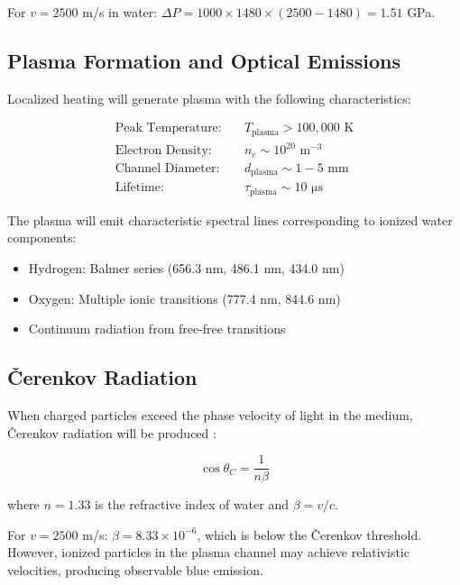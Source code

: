 \documentclass[12pt,a4paper]{article}
\begin{document}
For $v = 2500$ m/s in water: $\Delta P = 1000 \times 1480 \times (2500 - 1480) = 1.51$ GPa.

\subsection{Plasma Formation and Optical Emissions}

Localized heating will generate plasma with the following characteristics:

\begin{align}
\text{Peak Temperature:} &\quad T_{\text{plasma}} > 100,000 \text{ K} \\
\text{Electron Density:} &\quad n_e \sim 10^{20} \text{ m}^{-3} \\
\text{Channel Diameter:} &\quad d_{\text{plasma}} \sim 1-5 \text{ mm} \\
\text{Lifetime:} &\quad \tau_{\text{plasma}} \sim 10 \text{ μs}
\end{align}

The plasma will emit characteristic spectral lines corresponding to ionized water components:
\begin{itemize}
\item Hydrogen: Balmer series (656.3 nm, 486.1 nm, 434.0 nm) \cite{griem1997principles}
\item Oxygen: Multiple ionic transitions (777.4 nm, 844.6 nm) \cite{ralchenko2008nist}
\item Continuum radiation from free-free transitions
\end{itemize}

\subsection{Čerenkov Radiation}

When charged particles exceed the phase velocity of light in the medium, Čerenkov radiation will be produced \cite{jelley1958cerenkov}:

\begin{equation}
\cos\theta_C = \frac{1}{n\beta}
\label{eq:cerenkov_angle}
\end{equation}

where $n = 1.33$ is the refractive index of water and $\beta = v/c$.

For $v = 2500$ m/s: $\beta = 8.33 \times 10^{-6}$, which is below the Čerenkov threshold. However, ionized particles in the plasma channel may achieve relativistic velocities, producing observable blue emission.
\end{document}
